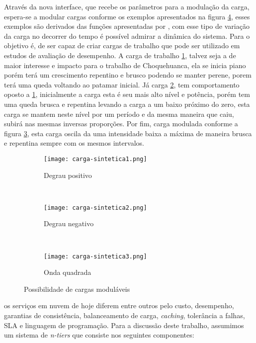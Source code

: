 Através da nova interface, que recebe os parâmetros para a modulação da carga, espera-se a modular cargas conforme os exemplos apresentados na figura	\ref{fig:cargas-moduladas-exemplos}, esses exemplos são derivados das funções apresentadas por \cite{Hellerstein2004}, com esse tipo de variação da carga no decorrer do tempo é possível admirar a dinâmica do sistema.  Para \cite{Feitelson2015} o objetivo é, de ser capaz de criar cargas de trabalho que pode ser utilizado em estudos de avaliação de desempenho. 
A carga de trabalho \ref{fig:degrau-positivo}, talvez seja a de maior interesse e impacto para o trabalho de Choquehuanca, ela se inicia piano porém terá um crescimento repentino e brusco podendo se manter perene, porem terá uma queda voltando ao patamar inicial. Já carga \ref{fig:degrau-negativo}, tem comportamento oposto a \ref{fig:degrau-positivo}, inicialmente a carga esta é seu mais alto nível e potência, porém tem uma queda brusca e repentina levando a carga a um baixo próximo do zero, esta carga se mantem neste nível por um período e da mesma maneira que caiu, subirá nas mesmas inversas proporções. Por fim, carga modulada conforme a figura \ref{fig:onda-gradrada}, esta carga oscila da uma intensidade baixa a máxima de maneira brusca e repentina sempre com os mesmos intervalos.
 
\begin{figure}[!htb]
	\centering
	\begin{subfigure}[b]{0.45\textwidth}
		\texttt{[image: carga-sintetica1.png]}
		\caption{Degrau positivo}
		\label{fig:degrau-positivo}
	\end{subfigure}
	~
	\begin{subfigure}[b]{0.45\textwidth}
		\texttt{[image: carga-sintetica2.png]}
		\caption{Degrau negativo}
		\label{fig:degrau-negativo}
	\end{subfigure}
	~
	\begin{subfigure}[b]{0.45\textwidth}
		\texttt{[image: carga-sintetica3.png]}
		\caption{Onda quadrada}
		\label{fig:onda-gradrada}
	\end{subfigure}
	\caption{Possibilidade de cargas moduláveis}
	\label{fig:cargas-moduladas-exemplos}
\end{figure}


\cite{Binnig2009} os serviços em nuvem de hoje diferem entre outros pelo custo, desempenho, garantias de consistência, balanceamento de carga, \textit{caching}, tolerância a falhas, SLA e linguagem de programação. Para a discussão deste trabalho, assumimos um sistema de \textit{n-tiers} que consiste nos seguintes componentes:

